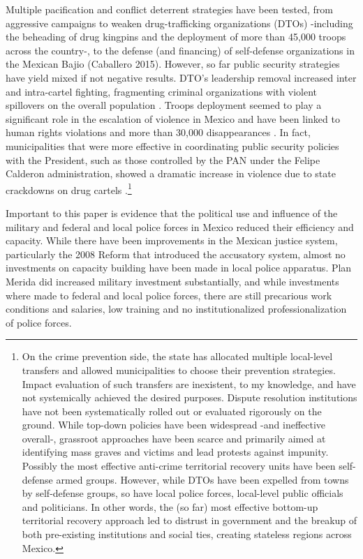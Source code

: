 \documentclass[12pt]{amsart}
\numberwithin{equation}{section}
\theoremstyle{definition}
\theoremstyle{definition}
\theoremstyle{definition}
\begin{document}
Multiple pacification and conflict deterrent strategies have been tested, from aggressive campaigns to weaken drug-trafficking organizations (DTOs) -including the beheading of drug kingpins and the deployment of more than 45,000 troops across the country-, to the defense (and financing) of self-defense organizations in the Mexican Bajio (Caballero 2015). However, so far public security strategies have yield mixed if not negative results. DTO's leadership removal increased inter and intra-cartel fighting, fragmenting criminal organizations with violent spillovers on the overall population \citep{guerrero_2011}. Troops deployment seemed to play a significant role in the escalation of violence in Mexico \citep{escalante_2011} and have been linked to human rights violations and more than 30,000 disappearances \citep{daly_etal_2012, moloeznik_etal_2012, magaloni_magaloni_razu_2018}. In fact, municipalities that were more effective in coordinating public security policies with the President, such as those controlled by the PAN under the Felipe Calderon administration, showed a dramatic increase in violence due to state crackdowns on drug cartels \citep{dell_2015}.\footnote{On the crime prevention side, the state has allocated multiple local-level transfers and allowed municipalities to choose their prevention strategies. Impact evaluation of such transfers are inexistent, to my knowledge, and have not systemically achieved the desired purposes. Dispute resolution institutions have not been systematically rolled out or evaluated rigorously on the ground. While top-down policies have been widespread -and ineffective overall-, grassroot approaches have been scarce and primarily aimed at identifying mass graves and victims and lead protests against impunity. Possibly the most effective anti-crime territorial recovery units have been self-defense armed groups. However, while DTOs have been expelled from towns by self-defense groups, so have local police forces, local-level public officials and politicians. In other words, the (so far) most effective bottom-up territorial recovery approach led to distrust in government and the breakup of both pre-existing institutions and social ties, creating stateless regions across Mexico.}

Important to this paper is evidence that the political use and influence of the military \citep{aguayo_2001, moloeznik_2010, lopez_gonzalez_2012} and federal and local police forces in Mexico \citep{zepeda_2010, sabet_2012, lopez_portillo_2012, davis_2017} reduced their efficiency and capacity. While there have been improvements in the Mexican justice system, particularly the 2008 Reform that introduced the accusatory system, almost no investments on capacity building have been made in local police apparatus. Plan Merida did increased military investment substantially, and while investments where made to federal and local police forces, there are still precarious work conditions and salaries, low training and no institutionalized professionalization of police forces. 
\end{document}
